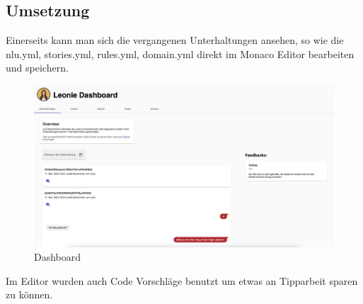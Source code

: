 \subsection{Umsetzung}

Einerseits kann man sich die vergangenen Unterhaltungen ansehen, so wie die nlu.yml, stories.yml, rules.yml, domain.yml direkt im Monaco Editor bearbeiten und speichern.

\begin{figure}[hbt!]
    \centering
    \includegraphics[scale=0.2]{pics/dashboardConvo}
    \caption{Dashboard}
    \label{fig:impl:dashConv}
\end{figure}

Im Editor wurden auch Code Vorschläge benutzt um etwas an Tipparbeit sparen zu können.

